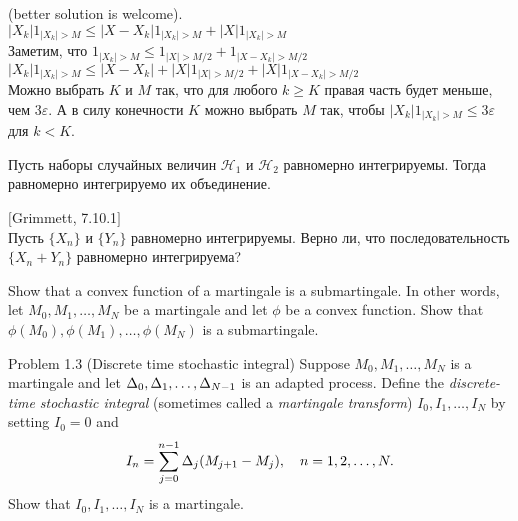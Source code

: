 \begin{solution}
\begin{solution}
\begin{solution}
\begin{solution}
\begin{solution}
\begin{solution}
\begin{solution}
\begin{solution}
\begin{solution}
{\begin{solution}
(better solution is welcome). \\
$|X_{k}|1_{|X_{k}|>M}\le |X-X_{k}|1_{|X_{k}|>M}+|X|1_{|X_{k}|>M}$
\\
Заметим, что $1_{|X_{k}|>M}\le 1_{|X|>M/2}+1_{|X-X_{k}|>M/2}$ \\
$|X_{k}|1_{|X_{k}|>M}\le
|X-X_{k}|+|X|1_{|X|>M/2}+|X|1_{|X-X_{k}|>M/2}$ \\
Можно выбрать $K$ и $M$ так, что для любого $k\ge K$ правая часть
будет меньше, чем $3\varepsilon$. А в силу конечности $K$ можно
выбрать $M$ так, чтобы $|X_{k}|1_{|X_{k}|>M}\le 3\varepsilon$ для
$k<K$.
\end{solution}

\begin{problem}
Пусть наборы случайных величин $\mathcal{H}_{1}$ и
$\mathcal{H}_{2}$ равномерно интегрируемы.
Тогда равномерно интегрируемо их объединение. 
\end{problem} 
\begin{solution} 

\end{solution}

\begin{problem}
 $[$Grimmett, 7.10.1$]$\\
 Пусть $\{X_{n}\}$ и $\{Y_{n}\}$ равномерно
интегрируемы. Верно ли, что последовательность $\{X_{n}+Y_{n}\}$
равномерно интегрируема?
\end{problem} 
\begin{solution} 

\end{solution}

\begin{problem}
 Show that a convex function of a martingale is a submartingale.
In other words, let $M_0,M_1,\dots,M_N$ be a martingale and let $\phi$ be a convex function.
Show that $\phi(M_0),\phi(M_1),\dots,\phi(M_N)$ is a submartingale.
\end{problem} 
\begin{solution} 

\end{solution}

\begin{problem}
Problem 1.3 (Discrete time stochastic integral) Suppose $M_0,M_1,\dots,M_N$
is a martingale and let $\Delta_0,\Delta_1,\dots,\Delta_{N-1}$ is an adapted process. Define the
\emph{discrete-time stochastic integral} (sometimes called a \emph{martingale transform})
$I_0,I_1,\dots,I_N$ by setting $I_0=0$ and
\[
I_n=\sum\limits_{j=0}^{n-1} \Delta_j (M_{j+1}-M_j),\quad n=1,2,\dots,N.
\]
\ni Show that $I_0,I_1,\dots,I_N$ is a martingale.
\end{problem} 
\begin{solution} 


\end{solution}}
\end{solution}
\end{solution}
\end{solution}
\end{solution}
\end{solution}
\end{solution}
\end{solution}
\end{solution}
\end{solution}
